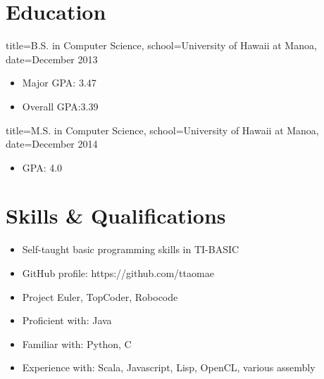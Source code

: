 \documentclass{resume}
\begin{document}

\makeheader

\section*{Education}
\begin{degree}{title=B.S. in Computer Science,
               school=University of Hawaii at Manoa,
               date=December 2013}
    \begin{itemize}
        \item{Major GPA: 3.47}
        \item{Overall GPA:3.39}
    \end{itemize}
\end{degree}

\begin{degree}{title=M.S. in Computer Science,
               school=University of Hawaii at Manoa,
               date=December 2014}
    \begin{itemize}
        \item{GPA: 4.0}
    \end{itemize}
\end{degree}

\section*{Skills \& Qualifications}
\begin{itemize}
    \item{Self-taught basic programming skills in TI-BASIC}
\end{itemize}

\begin{itemize}
    \item{GitHub profile: https://github.com/ttaomae}
    \item{Project Euler, TopCoder, Robocode}
\end{itemize}

\begin{itemize}
    \item{Proficient with: Java}
    \item{Familiar with: Python, C}
    \item{Experience with: Scala, Javascript, Lisp, OpenCL, various assembly}
\end{itemize}
\end{document}
